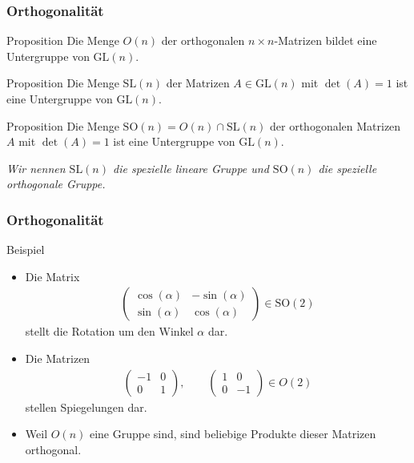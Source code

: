 \documentclass{beamer}
\renewcommand{\ae}{\"a}
\newcommand{\GL}{\mathrm{GL}}
\newcommand{\SL}{\mathrm{SL}}
\newcommand{\SO}{\mathrm{SO}}
\newcommand{\mytitle}{Orthogonalit\ae t}
\begin{document}
\begin{frame}\frametitle{\mytitle}
	\begin{block}{Proposition}
		Die Menge $O(n)$ der orthogonalen $n\times n$-Matrizen bildet eine Untergruppe von $\GL(n)$.
	\end{block}
	\begin{block}{Proposition}
		Die Menge $\SL(n)$ der Matrizen $A\in\GL(n)$ mit $\det(A)=1$ ist eine Untergruppe von $\GL(n)$.
	\end{block}
	\begin{block}{Proposition}
		Die Menge $\SO(n)=O(n)\cap\SL(n)$ der orthogonalen Matrizen $A$ mit $\det(A)=1$ ist eine Untergruppe von $\GL(n)$.
	\end{block}
	{\itshape Wir nennen $\SL(n)$ die spezielle lineare Gruppe und $\SO(n)$ die spezielle orthogonale Gruppe.}
\end{frame}

\begin{frame}\frametitle{\mytitle}
	\begin{block}{Beispiel}
		\begin{itemize}
			\item Die Matrix 
				\begin{align*}
					\begin{pmatrix} \cos(\alpha)&-\sin(\alpha)\\\sin(\alpha)&\cos(\alpha) \end{pmatrix}\in\SO(2)
				\end{align*}
				stellt die Rotation um den Winkel $\alpha$ dar.
			\item Die Matrizen
				\begin{align*}
					\begin{pmatrix} -1&0\\0&1 \end{pmatrix},\qquad
					\begin{pmatrix} 1&0\\0&-1 \end{pmatrix}\in O(2)
				\end{align*}
				stellen Spiegelungen dar.
			\item Weil $O(n)$ eine Gruppe sind, sind beliebige Produkte dieser Matrizen orthogonal.
		\end{itemize}
	\end{block}
\end{frame}
\end{document}
